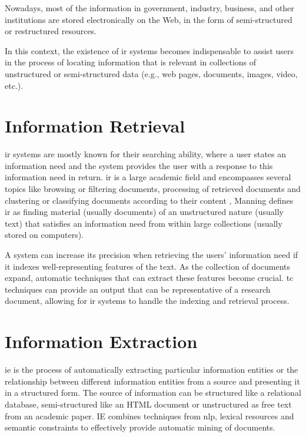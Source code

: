 Nowadays, most of the information in government, industry, business, and other institutions are stored electronically on the Web, in the form of semi-structured or restructured resources.



In this context, the existence of \gls{ir} systems becomes indispensable to assist users in the process of locating information that is relevant in collections of unstructured or semi-structured data (e.g., web pages, documents, images, video, etc.).  


\section{\hspace{3pt}Information Retrieval}

\gls{ir} systems are mostly known for their searching ability, where a user states an information need and the system provides the user with a response to this information need in return. \gls{ir} is a large academic field and encompasses several topics like browsing or filtering documents, processing of retrieved documents and clustering or classifying documents according to their content \cite{Manning:2008}, Manning defines \gls{ir} as finding material (usually documents) of an unstructured nature (usually text) that satisfies an information need from within large collections (usually stored on computers).

A system can increase its precision when retrieving the users' information need if it indexes well-representing features of the text. As the collection of documents expand, automatic techniques that can extract these features become crucial.  \gls{tc} techniques can provide an output that can be representative of a research document, allowing for \gls{ir} systems to handle the indexing and retrieval process.



\section{\hspace*{3pt}Information Extraction}

\gls{ie} is the process of automatically extracting particular information entities or the relationship between different information entities from a source \cite{sarawagi2008information} and presenting it in a structured form. The source of information can be structured like a relational database, semi-structured like an HTML document or unstructured as free text from an academic paper. IE combines techniques from \gls{nlp}, lexical resources and semantic constraints to effectively provide automatic mining of documents.


